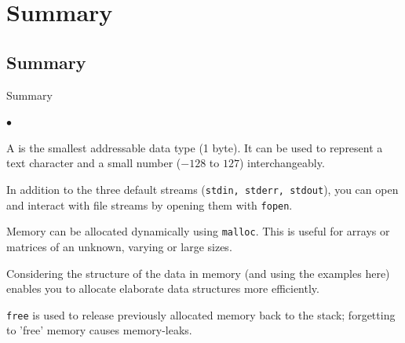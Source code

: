 \documentclass[smaller,table]{beamer}
\begin{document}
\section{Summary}
\subsection{Summary}
\begin{frame}{Summary}
\begin{list}{$\bullet$}{}
\item A  is the smallest addressable data type (1 byte). It can be used to represent a text character and a small number ($-128$ to $127$) interchangeably.
\item In addition to the three default streams (\texttt{stdin, stderr, stdout}), you can open and interact with file streams by opening them with \texttt{fopen}.
\item Memory can be allocated dynamically using \texttt{malloc}. This is useful for arrays or matrices of an unknown, varying or large sizes.
\item Considering the structure of the data in memory (and using the examples here) enables you to allocate elaborate data structures more efficiently.
\item \texttt{free} is used to release previously allocated memory back to the stack; forgetting to 'free' memory causes memory-leaks.
\end{list}
\end{frame}
\end{document}
